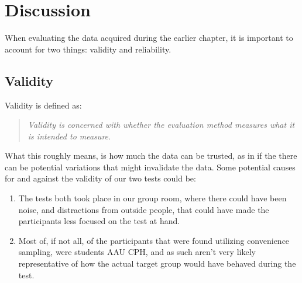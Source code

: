 \chapter{Discussion}
When evaluating the data acquired during the earlier chapter, it is important to account for two things: validity and reliability.
\section*{Validity}
	Validity is defined as:\\
	\begin{quote}
		\textit{Validity is concerned with whether the evaluation method measures what it is intended to measure}\cite{interactionDesign}.\\
	\end{quote}
	What this roughly means, is how much the data can be trusted, as in if the there can be potential variations that might invalidate the data. Some potential causes for and against the validity of our two tests could be:\\
	\begin{enumerate}
		\item The tests both took place in our group room, where there could have been noise, and distractions from outside people, that could have made the participants less focused on the test at hand.\\
		
		\item Most of, if not all, of the participants that were found utilizing convenience sampling, were students AAU CPH, and as such aren't very likely representative of how the actual target group would have behaved during the test.
		
	\end{enumerate}
